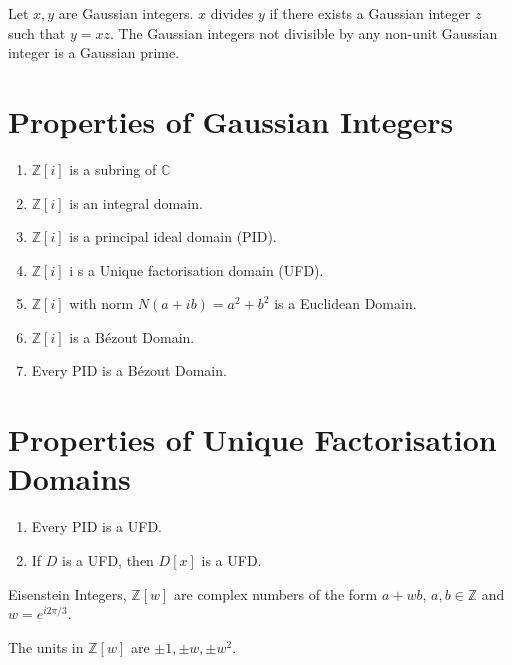 	Let $x,y$ are Gaussian integers. $x$ divides $y$ if there exists a Gaussian integer $z$ such that $y = xz$.
	The Gaussian integers not divisible by any non-unit Gaussian integer is a Gaussian prime.
\section{Properties of Gaussian Integers}
	\begin{enumerate}
		\item $\mathbb{Z}[i]$ is a subring of $\mathbb{C}$
		\item $\mathbb{Z}[i]$ is an integral domain.
		\item $\mathbb{Z}[i]$ is a principal ideal domain (PID).
		\item $\mathbb{Z}[i]$ i s a Unique factorisation domain (UFD).
		\item $\mathbb{Z}[i]$ with norm $N(a+ib) = a^2+b^2$ is a Euclidean Domain.
		\item $\mathbb{Z}[i]$ is a B\'ezout Domain.
		\item Every PID is a B\'ezout Domain.
	\end{enumerate}

\section{Properties of Unique Factorisation Domains}
\begin{enumerate}
	\item Every PID is a UFD.
	\item If $D$ is a UFD, then $D[x]$ is a UFD.
\end{enumerate}

\begin{definition}
	Eisenstein Integers, $\mathbb{Z}[w]$ are complex numbers of the form $a+wb$, $a,b \in \mathbb{Z}$ and $w = e^{i2\pi/3}$.
\end{definition}
	The units in $\mathbb{Z}[w]$ are $\pm 1, \pm w, \pm w^2$.
